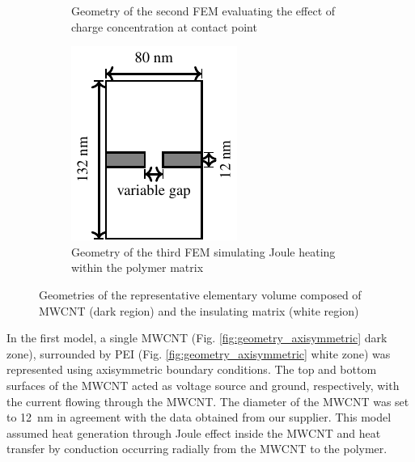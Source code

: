 \documentclass[11pt,review,times]{article}
\begin{document}
\begin{figure}[htb]
\begin{subfigure}{0.44\textwidth}
		\caption{Geometry of the second FEM evaluating the effect of charge concentration at contact point}
		\label{fig:geometry_3D}
	\end{subfigure}
	\begin{subfigure}{0.27\textwidth}
		\center
		\captionsetup{width=0.9\textwidth}
		\includegraphics[width=\textwidth]{geometry_gap}
		\caption{Geometry of the third FEM simulating Joule heating within the polymer matrix}
		\label{fig:geometry_gap}
	\end{subfigure} 
	\caption{Geometries of the representative elementary volume composed of MWCNT (dark region) and the insulating matrix (white region) \cite{Brassard2018_REV}}
	\label{fig:geometry}
\end{figure}

\FloatBarrier

In the first model, a single MWCNT (Fig. \ref{fig:geometry_axisymmetric} dark zone), surrounded by PEI (Fig. \ref{fig:geometry_axisymmetric} white zone) was represented using axisymmetric boundary conditions. 
The top and bottom surfaces of the MWCNT acted as voltage source and ground, respectively, with the current flowing through the MWCNT. 
The diameter of the MWCNT was set to \SI{12}{\nano\metre} in agreement with the data obtained from our supplier. 
This model assumed heat generation through Joule effect inside the MWCNT and heat transfer by conduction occurring radially from the MWCNT to the polymer.
\end{document}

